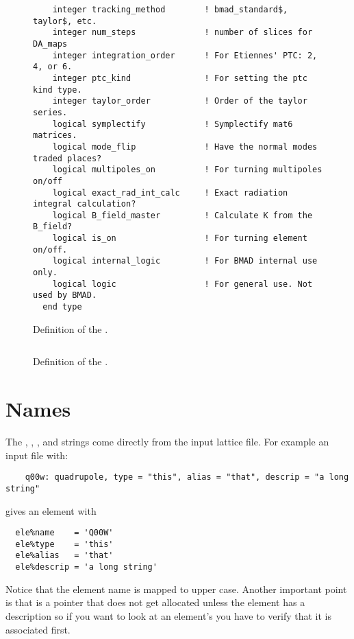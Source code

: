 \begin{figure}[tb]
\begin{verbatim}
    integer tracking_method        ! bmad_standard$, taylor$, etc.
    integer num_steps              ! number of slices for DA_maps
    integer integration_order      ! For Etiennes' PTC: 2, 4, or 6.
    integer ptc_kind               ! For setting the ptc kind type.
    integer taylor_order           ! Order of the taylor series.
    logical symplectify            ! Symplectify mat6 matrices.
    logical mode_flip              ! Have the normal modes traded places?
    logical multipoles_on          ! For turning multipoles on/off
    logical exact_rad_int_calc     ! Exact radiation integral calculation?
    logical B_field_master         ! Calculate K from the B_field?
    logical is_on                  ! For turning element on/off.
    logical internal_logic         ! For BMAD internal use only.
    logical logic                  ! For general use. Not used by BMAD.
  end type
\end{verbatim}
\caption{Definition of the \elestruct.}
\label{f:ele_struct}
\end{figure}

\begin{figure}[tb]
\centering
\begin{verbatim}
\end{verbatim}
\caption{Definition of the \elestruct.}
\label{f:subele_struct}
\end{figure}

\section{Names}

The , , , and  strings come directly
from the input lattice file. For example an input file with:
\begin{verbatim}
    q00w: quadrupole, type = "this", alias = "that", descrip = "a long string"
\end{verbatim}
gives an element with
\begin{verbatim}
  ele%name    = 'Q00W'
  ele%type    = 'this'
  ele%alias   = 'that'
  ele%descrip = 'a long string'
\end{verbatim}
Notice that the element name is mapped to upper case. Another
important point is that  is a pointer that does not get
allocated unless the element has a description so if you want to look
at an element's  you have to verify that it is associated
first.

